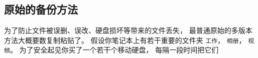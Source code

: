 
\subsection{原始的备份方法}
为了防止文件被误删、误改、硬盘损坏等带来的文件丢失， 最普通原始的多版本方法大概要数复制粘贴了。 假设你笔记本上有若干重要的文件夹 \verb|工作|， \verb|相册|， \verb|视频|。 为了安全起见你买了一个若干个移动硬盘， 每隔一段时间把它们
